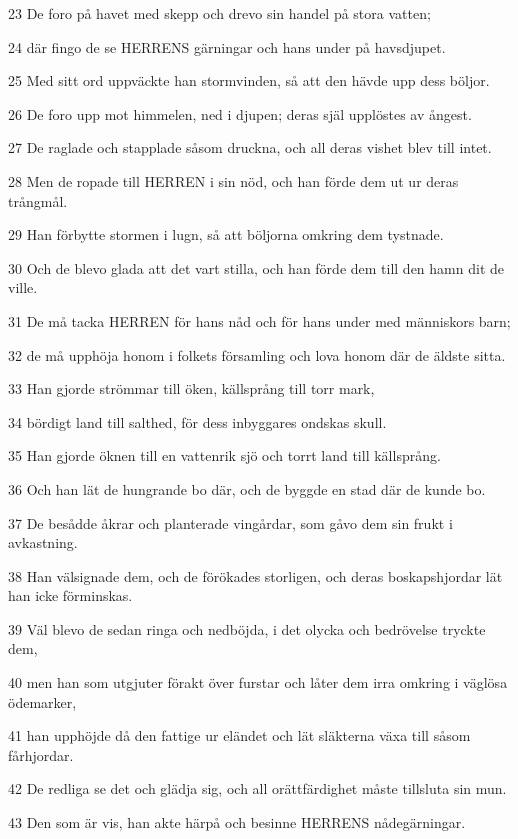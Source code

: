 \par 23 De foro på havet med skepp och drevo sin handel på stora vatten;
\par 24 där fingo de se HERRENS gärningar och hans under på havsdjupet.
\par 25 Med sitt ord uppväckte han stormvinden, så att den hävde upp dess böljor.
\par 26 De foro upp mot himmelen, ned i djupen; deras själ upplöstes av ångest.
\par 27 De raglade och stapplade såsom druckna, och all deras vishet blev till intet.
\par 28 Men de ropade till HERREN i sin nöd, och han förde dem ut ur deras trångmål.
\par 29 Han förbytte stormen i lugn, så att böljorna omkring dem tystnade.
\par 30 Och de blevo glada att det vart stilla, och han förde dem till den hamn dit de ville.
\par 31 De må tacka HERREN för hans nåd och för hans under med människors barn;
\par 32 de må upphöja honom i folkets församling och lova honom där de äldste sitta.
\par 33 Han gjorde strömmar till öken, källsprång till torr mark,
\par 34 bördigt land till salthed, för dess inbyggares ondskas skull.
\par 35 Han gjorde öknen till en vattenrik sjö och torrt land till källsprång.
\par 36 Och han lät de hungrande bo där, och de byggde en stad där de kunde bo.
\par 37 De besådde åkrar och planterade vingårdar, som gåvo dem sin frukt i avkastning.
\par 38 Han välsignade dem, och de förökades storligen, och deras boskapshjordar lät han icke förminskas.
\par 39 Väl blevo de sedan ringa och nedböjda, i det olycka och bedrövelse tryckte dem,
\par 40 men han som utgjuter förakt över furstar och låter dem irra omkring i väglösa ödemarker,
\par 41 han upphöjde då den fattige ur eländet och lät släkterna växa till såsom fårhjordar.
\par 42 De redliga se det och glädja sig, och all orättfärdighet måste tillsluta sin mun.
\par 43 Den som är vis, han akte härpå och besinne HERRENS nådegärningar.

